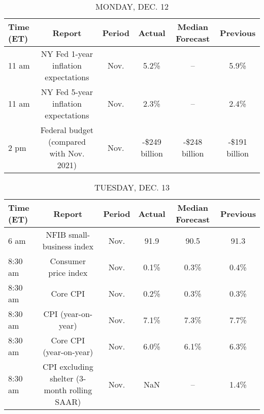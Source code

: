 \documentclass{article}%
\begin{document}
%
\normalsize%


\begin{table}[htbp]%
\caption{MONDAY, DEC. 12}%
\centering%
\begin{adjustbox}{width=1\textwidth}%
\begin{tabular}{lccccc}
\toprule
Time (ET) &                                   Report & Period &        Actual & Median Forecast &      Previous \\
\midrule
    11 am &     NY Fed 1-year inflation expectations &   Nov. &          5.2\% &              -- &          5.9\% \\
    11 am &     NY Fed 5-year inflation expectations &   Nov. &          2.3\% &              -- &          2.4\% \\
     2 pm & Federal budget (compared with Nov. 2021) &   Nov. & -\$249 billion &   -\$248 billion & -\$191 billion \\
\bottomrule
\end{tabular}
%
\end{adjustbox}%
\end{table}

%


\begin{table}[htbp]%
\caption{TUESDAY, DEC. 13}%
\centering%
\begin{adjustbox}{width=1\textwidth}%
\begin{tabular}{lccccc}
\toprule
Time (ET) &                                       Report & Period & Actual & Median Forecast & Previous \\
\midrule
     6 am &                    NFIB small-business index &   Nov. &   91.9 &            90.5 &     91.3 \\
  8:30 am &                         Consumer price index &   Nov. &   0.1\% &            0.3\% &     0.4\% \\
  8:30 am &                                     Core CPI &   Nov. &   0.2\% &            0.3\% &     0.3\% \\
  8:30 am &                           CPI (year-on-year) &   Nov. &   7.1\% &            7.3\% &     7.7\% \\
  8:30 am &                      Core CPI (year-on-year) &   Nov. &   6.0\% &            6.1\% &     6.3\% \\
  8:30 am & CPI excluding shelter (3-month rolling SAAR) &   Nov. &    NaN &              -- &     1.4\% \\
\bottomrule
\end{tabular}
%
\end{adjustbox}%
\end{table}
\end{document}
